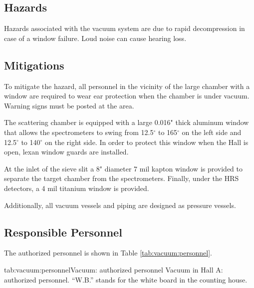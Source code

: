 \begin{safetyen}{0}{0}

\subsection{Hazards}
Hazards associated with the vacuum system are due to rapid 
decompression in case of a window failure. Loud noise can cause hearing
loss.  

\subsection{Mitigations}
To mitigate the hazard, all personnel in the vicinity of the 
large chamber with a window are required to wear ear protection when
the chamber is under vacuum. Warning signs must be posted at the area.

The scattering chamber is equipped with a large 0.016" thick aluminum window that 
allows the spectrometers to swing from 12.5$^{\circ}$ to 165$^{\circ}$ 
on the left side and 12.5$^{\circ}$ to 140$^{\circ}$ on the right side. 
In order to
protect this window when the Hall is open, lexan window guards are
installed.

At the inlet of the sieve slit a 8" diameter 7 mil kapton window 
is provided to separate the target chamber from the spectrometers.
Finally, under the HRS detectors, a 4 mil titanium window is provided.  

Additionally, all vacuum vessels and piping are designed as pressure 
vessels.
\end{safetyen}

\begin{safetyen}{0}{0}
\subsection{Responsible Personnel}
\end{safetyen}
The authorized personnel is shown in Table \ref{tab:vacuum:personnel}.
\begin{namestab}{tab:vacuum:personnel}{Vacuum: authorized personnel}{%
      Vacuum in Hall A: authorized personnel. ``W.B.'' stands for the white board 
      in the counting house.}
  \EdFolts{}
\end{namestab}


